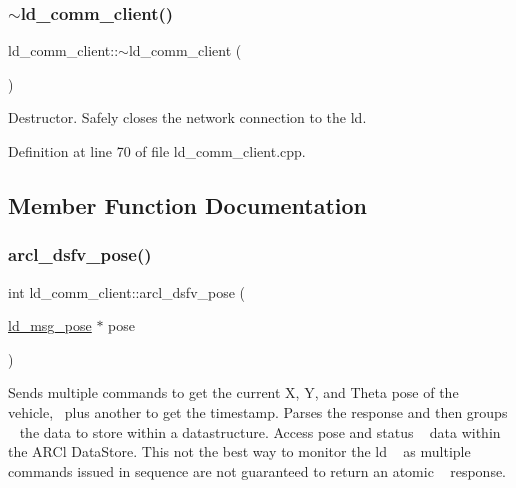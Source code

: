 \subsubsection{\texorpdfstring{$\sim$ld\+\_\+comm\+\_\+client()}{~ld\_comm\_client()}}
{\footnotesize\ttfamily ld\+\_\+comm\+\_\+client\+::$\sim$ld\+\_\+comm\+\_\+client (\begin{DoxyParamCaption}{ }\end{DoxyParamCaption})}

Destructor. Safely closes the network connection to the ld. 

Definition at line 70 of file ld\+\_\+comm\+\_\+client.\+cpp.



\subsection{Member Function Documentation}
\mbox{\label{classld__comm__client_a9dfef26a96307abc124c780148b2fdd1}} 
\subsubsection{\texorpdfstring{arcl\+\_\+dsfv\+\_\+pose()}{arcl\_dsfv\_pose()}}
{\footnotesize\ttfamily int ld\+\_\+comm\+\_\+client\+::arcl\+\_\+dsfv\+\_\+pose (\begin{DoxyParamCaption}\item[{\mbox{\hyperlink{structld__msg__pose}{ld\+\_\+msg\+\_\+pose}} $\ast$}]{pose }\end{DoxyParamCaption})}

Sends multiple commands to get the current X, Y, and Theta pose of the vehicle,~\newline
plus another to get the timestamp. Parses the response and then groups ~\newline
the data to store within a datastructure. Access pose and status ~\newline
data within the A\+R\+Cl Data\+Store. This not the best way to monitor the ld ~\newline
as multiple commands issued in sequence are not guaranteed to return an atomic ~\newline
response. ~\newline

